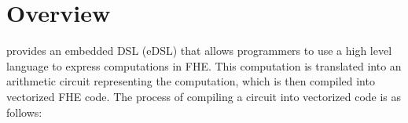 \section{\system Overview}\label{sec:overview}

\system provides an embedded DSL (eDSL) that allows programmers to use a high level language to express computations in FHE. This computation is translated into an arithmetic circuit representing the computation, which is then compiled into vectorized FHE code. The process of compiling a circuit into vectorized code is as follows:


 
